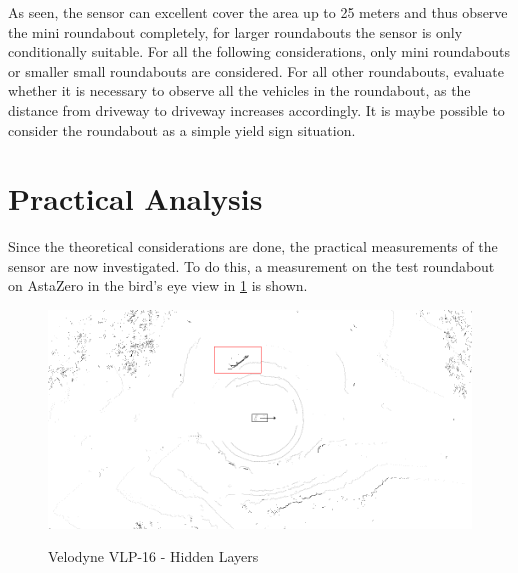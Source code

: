 \documentclass[11pt,oneside,openright]{mpreport}
\begin{document}

As seen, the sensor can excellent cover the area up to 25 meters and thus observe the mini roundabout completely, for larger roundabouts the sensor is only conditionally suitable. 
For all the following considerations, only mini roundabouts or smaller small roundabouts are considered. 
For all other roundabouts, evaluate whether it is necessary to observe all the vehicles in the roundabout, as the distance from driveway to driveway increases accordingly.
It is maybe possible to consider the roundabout as a simple yield sign situation.

\section{Practical Analysis}

Since the theoretical considerations are done, the practical measurements of the sensor are now investigated.
To do this, a measurement on the test roundabout on AstaZero in the bird's eye view in \cref{velodyne_hidden} is shown.

\begin{figure}[!ht]
\caption{Velodyne VLP-16 - Hidden Layers}
\includegraphics[width=\textwidth]{bilder/velodyne_back.png}
\label{velodyne_hidden}
\end{figure}
\end{document}
